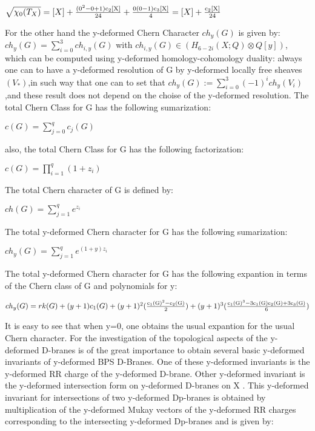 \documentclass[a4paper,a4paper]{article}
\begin{document}
\begin{center}
{  $\sqrt{{\chi}_0(T_{X})} =[X]+\frac{\rm (0^2-0+1)c_{2}[X]}{\rm 24}+\frac{\rm 0(0-1)c_{3}[X]}{\rm 4}=[X]+\frac{\rm c_{2}[X]}{\rm 24} $ }
\end{center}

For the other hand  the y-deformed Chern Character $ch_y(G)$  is given by:
$ ch_y(G)= \sum_{i=0}^{3}ch_{i,y}(G)$ with $ ch_{i,y}(G){\in}(H_{6-2i}(X;Q){\otimes}Q[y])$, which can be computed using y-deformed homology-cohomology duality: always one can to have a y-deformed resolution of G by y-deformed locally free sheaves  $(V_{*}) $,in such way that one can to set that $ ch_y(G):= \sum_{i=0}^{3}(-1)^ich_y(V_i)$,and these result does not depend on the choise of the y-deformed resolution.
The total Chern Class for G  has the following sumarization:
\begin{center}
{  $ c(G) = \sum_{j=0}^{q}c_j(G) $ }
\end{center} 
also, the total Chern Class for G has the following factorization:

\begin{center}
{  $ c(G) = \prod_{i=1}^{q}(1+z_i)$ }
\end{center}
The total Chern character of G is defined by:
\begin{center}
{  $ ch(G) = \sum_{j=1}^{q}e^{z_i} $ }
\end{center} 

The total y-deformed Chern character for G  has the following sumarization:

\begin{center}
{  $ ch_y(G) = \sum_{j=1}^{q}e^{(1+y)z_i} $ }
\end{center}
The total y-deformed Chern character for G has the following expantion in terms of the Chern class of G and polynomials for y:

\begin{center}
{  $ ch_y(G) =rk(G)+(y+1)c_{1}(G)+(y+1)^2({\frac{\rm c_{1}(G)^{2}-c_2(G)}{\rm 2}})+(y+1)^3({\frac{\rm c_{1}(G)^{3}-3c_1(G)c_2(G)+3c_3(G)}{\rm 6}})
 $ }
\end{center}

It is easy to see that when y=0, one obtains the usual expantion for the usual Chern character.
For the investigation of the topological aspects of the y-deformed  D-branes is of the great importance to obtain several basic y-deformed invariants of y-deformed BPS D-Branes. One of these y-deformed invariants is the y-deformed RR charge of the y-deformed D-brane. Other y-deformed invariant is the y-deformed  intersection form on y-deformed D-branes on X . This y-deformed invariant for intersections of 
two y-deformed Dp-branes is obtained by multiplication of the y-deformed Mukay vectors of the y-deformed RR charges corresponding to the intersecting y-deformed Dp-branes and is given by: 
 
\end{document}
